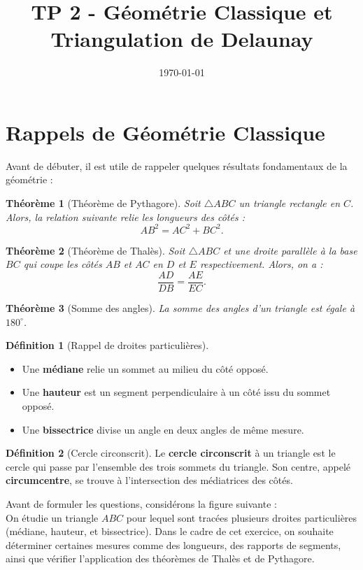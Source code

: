 \documentclass[a4paper,12pt]{article}
\title{TP 2 - Géométrie Classique et Triangulation de Delaunay}
\author{}
\date{\today}
\newtheorem{theorem}{Théorème}[section]
\theoremstyle{definition}
\newtheorem{definition}{Définition}[section]
\begin{document}
\makeonlytitle

\section{Rappels de Géométrie Classique}
\label{sec:rappels_de_g_om_trie_classique}
Avant de débuter, il est utile de rappeler quelques résultats fondamentaux de la géométrie :

\begin{theorem}[Théorème de Pythagore]
Soit \( \triangle ABC \) un triangle rectangle en \(C\). Alors, la relation suivante relie les longueurs des côtés :
\[
AB^2 = AC^2 + BC^2.
\]
\end{theorem}

\begin{theorem}[Théorème de Thalès]
Soit \( \triangle ABC \) et une droite parallèle à la base \(BC\) qui coupe les côtés \(AB\) et \(AC\) en \(D\) et \(E\) respectivement. Alors, on a :
\[
\frac{AD}{DB} = \frac{AE}{EC}.
\]
\end{theorem}

\begin{theorem}[Somme des angles]
La somme des angles d’un triangle est égale à \(180^\circ\).
\end{theorem}

\begin{definition}[Rappel de droites particulières]
\begin{itemize}
  \item Une \textbf{médiane} relie un sommet au milieu du côté opposé.
  \item Une \textbf{hauteur} est un segment perpendiculaire à un côté issu du sommet opposé.
  \item Une \textbf{bissectrice} divise un angle en deux angles de même mesure.
\end{itemize}
\end{definition}

\begin{definition}[Cercle circonscrit]
Le \textbf{cercle circonscrit} à un triangle est le cercle qui passe par l'ensemble des trois sommets du triangle. Son centre, appelé \textbf{circumcentre}, se trouve à l'intersection des médiatrices des côtés.
\end{definition}


Avant de formuler les questions, considérons la figure suivante :\\
On étudie un triangle \(ABC\) pour lequel sont tracées plusieurs droites particulières (médiane, hauteur, et bissectrice). Dans le cadre de cet exercice, on souhaite déterminer certaines mesures comme des longueurs, des rapports de segments, ainsi que vérifier l’application des théorèmes de Thalès et de Pythagore.
\end{document}
